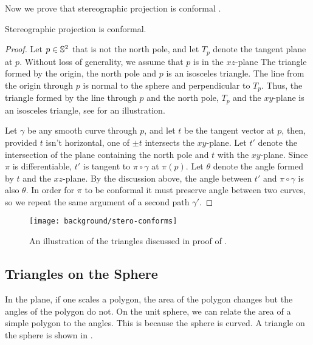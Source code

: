 Now we prove that stereographic projection is conformal \cite{hilbert-imagination}.

\begin{theorem}\label{thm:stereo-confroms}
Stereographic projection is conformal.
\end{theorem}
\begin{proof}
	Let $p\in\mathbb{S}^2$ that is not the north pole, and let $T_p$ denote the tangent
	plane at $p$. Without loss of generality, we assume that $p$ is in the $xz$-plane
	The triangle formed by the origin, the north pole and $p$
	is an isosceles triangle. 
	The line from the origin through $p$ is normal to the sphere and perpendicular
	to $T_p$. Thus, the triangle formed by the line through $p$ and the north pole,
	$T_p$ and the $xy$-plane is an isosceles triangle, see  for an illustration.
	
	Let $\gamma$ be any smooth curve through $p$, and let $t$ be the tangent vector at $p$, then,
	 provided $t$ isn't horizontal, one of $\pm t$
	intersects the $xy$-plane. Let $t'$ denote the intersection of the plane containing the north
	pole and $t$ with the $xy$-plane. Since $\pi$ is differentiable, $t'$ is tangent to $\pi \circ \gamma$ 
	at $\pi(p)$. Let $\theta$ denote the angle formed by $t$ and the $xz$-plane. By the discussion
	above, the angle between $t'$ and $\pi \circ \gamma$ is also $\theta$. 
	In order for $\pi$ to be conformal it must preserve angle between two curves, so we repeat 
	the same argument of a second path $\gamma'$.
	
	
\end{proof}

\begin{figure}[htb]
	\centering
	\texttt{[image: background/stero-conforms]}
	\caption{An illustration of the triangles discussed in proof of .}
	\label{fig:conforms}
\end{figure}
	
\subsection{Triangles on the Sphere}

In the plane, if one scales a polygon, the area of the polygon changes
but the angles of the polygon do not.
On the unit sphere, we can relate the area of a simple polygon 
to the angles. This is because the sphere is curved.
A triangle on the sphere is shown in .



